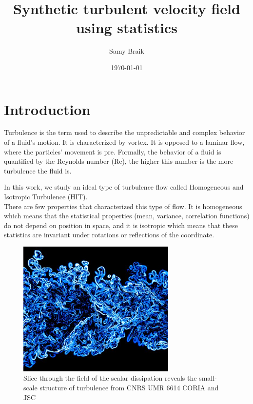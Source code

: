 \documentclass[a4paper,12pt]{article}
\title{Synthetic turbulent velocity field using statistics}
\author{Samy Braik}
\date{\today}
\theoremstyle{definition}
\begin{document}
\maketitle


\newpage
\tableofcontents
\newpage

\section{Introduction}
Turbulence is the term used to describe the unpredictable and complex behavior of a fluid's motion. It is characterized by vortex. It is opposed to a laminar flow, where the particles' movement is pre. Formally, the behavior of a fluid is quantified by the Reynolds number (Re), the higher this number is the more turbulence the fluid is. 

\bigskip
In this work, we study an ideal type of turbulence flow called Homogeneous and Isotropic Turbulence (HIT). \\
There are few properties that characterized this type of flow. It is homogeneous which means that the statistical properties (mean, variance, correlation functions) do not depend on position in space, and it is isotropic which means that these statistics are invariant under rotations or reflections of the coordinate.\\

\begin{figure}[H]
    \centering
    \includegraphics[width=0.7\textwidth]{illustrations/TurbulenceExample.jpg}
    \caption{Slice through the field of the scalar dissipation reveals the small-scale structure of turbulence from CNRS UMR 6614 CORIA and JSC}
\end{figure}
\end{document}
